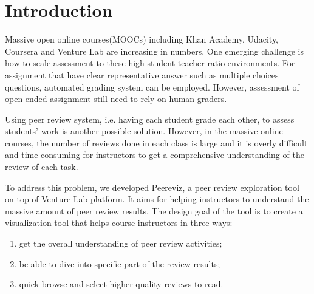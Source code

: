 \documentclass{sigchi}
\begin{document}



\section{Introduction}
Massive open online courses(MOOCs) including Khan Academy, Udacity, Coursera and
Venture Lab are increasing in numbers. \cite{nytimes} One emerging challenge is
how to scale assessment to these high student-teacher ratio environments.
For assignment that have clear representative answer
such as multiple choices questions,
automated grading system can be employed.
However, assessment of open-ended assignment still need to rely on human graders.

Using peer review system, i.e. having each student grade each other, \cite{cpr}
to assess students’ work is another possible solution.
However, in the massive online courses, the number of reviews done in each class
is large and it is overly difficult
and time-consuming for instructors to get a comprehensive understanding
of the review of each task.

To address this problem, we developed Peereviz, a peer review exploration tool
on top of Venture Lab platform. It aims for helping instructors to understand
the massive amount of peer review results. The design goal of the tool is to
create a visualization tool that helps course instructors in three ways:

\begin{enumerate}
\item get the overall understanding of peer review activities;
\item be able to dive into specific part of the review results;
\item quick browse and select higher quality reviews to read.
\end{enumerate}
\end{document}
